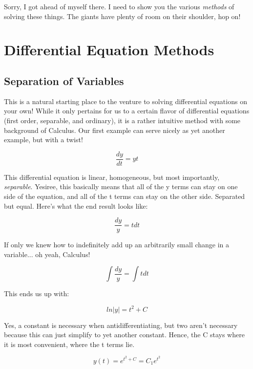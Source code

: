 \documentclass[10pt]{extarticle}
\begin{document}
\begin{multicols}{2}
Sorry, I got ahead of myself there. I need to show you the various {\em
methods} of solving these things. The giants have plenty of room on their
shoulder, hop on!


\section{Differential Equation Methods}

\subsection{Separation of Variables}

This is a natural starting place to the venture to solving differential
equations on your own! While it only pertains for us to a certain flavor of
differential equations (first order, separable, and ordinary),
it is a rather intuitive method with some background of Calculus. Our first
example can serve nicely as yet another example, but with a twist!

\begin{equation*}
    \dfrac{dy}{dt} = yt
\end{equation*}

This differential equation is linear, homogeneous, but most importantly, {\em
separable}. Yesiree, this basically means that all of the y terms can stay on
one side of the equation, and all of the t terms can stay on the other side.
Separated but equal. Here's what the end result looks like:

\begin{equation*}
    \dfrac{dy}{y} = tdt
\end{equation*}

If only we knew how to indefinitely add up an arbitrarily small change in a
variable... oh yeah, Calculus!

\begin{equation*}
    \int\dfrac{dy}{y} = \int tdt
\end{equation*}

This ends us up with:

\begin{equation*}
    ln|y| = t^2 + C
\end{equation*}

Yes, a constant is necessary when antidifferentiating, but two aren't necessary
because this can just simplify to yet another constant. Hence, the C stays
where it is most convenient, where the t terms lie.

\begin{equation*}
    y(t) = e^{t^2 + C} = C_1e^{t^2}
\end{equation*}


\end{multicols}
\end{document}
